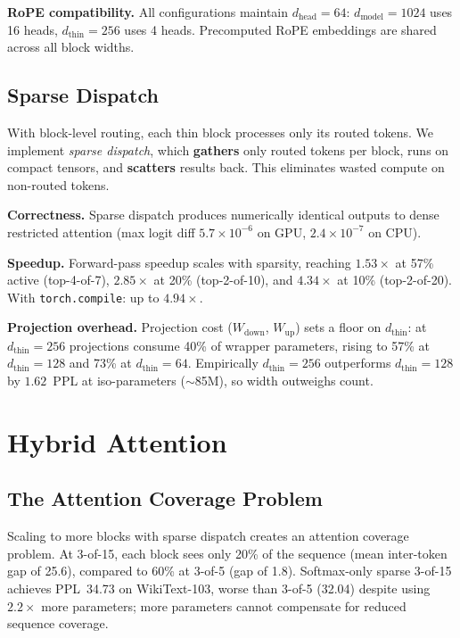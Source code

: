 \documentclass[10pt]{article}
\newcommand{\dmodel}{d_\text{model}}
\newcommand{\dthin}{d_\text{thin}}
\newcommand{\Paragraph}[1]{\vspace{0.5em}\noindent\textbf{#1}}
\begin{document}
\Paragraph{RoPE compatibility.}
All configurations maintain $d_\text{head}{=}64$: $\dmodel{=}1024$ uses 16 heads, $\dthin{=}256$ uses 4 heads.
Precomputed RoPE embeddings are shared across all block widths.

\subsection{Sparse Dispatch}
\label{sec:sparse}

With block-level routing, each thin block processes only its routed tokens.
We implement \emph{sparse dispatch}, which \textbf{gathers} only routed tokens per block, runs on compact tensors, and \textbf{scatters} results back.
This eliminates wasted compute on non-routed tokens.

\Paragraph{Correctness.}
Sparse dispatch produces numerically identical outputs to dense restricted attention (max logit diff $5.7 \times 10^{-6}$ on GPU, $2.4 \times 10^{-7}$ on CPU).

\Paragraph{Speedup.}
Forward-pass speedup scales with sparsity, reaching $1.53\times$ at 57\% active (top-4-of-7), $2.85\times$ at 20\% (top-2-of-10), and $4.34\times$ at 10\% (top-2-of-20).
With \texttt{torch.compile}: up to $4.94\times$.


\Paragraph{Projection overhead.}
Projection cost ($W_\text{down}$, $W_\text{up}$) sets a floor on $\dthin$: at $\dthin{=}256$ projections consume 40\% of wrapper parameters, rising to 57\% at $\dthin{=}128$ and 73\% at $\dthin{=}64$. Empirically $\dthin{=}256$ outperforms $\dthin{=}128$ by $1.62$~PPL at iso-parameters ($\sim$85M), so width outweighs count.

\section{Hybrid Attention}
\label{sec:hybrid}

\subsection{The Attention Coverage Problem}

Scaling to more blocks with sparse dispatch creates an attention coverage problem. At 3-of-15, each block sees only 20\% of the sequence (mean inter-token gap of 25.6), compared to 60\% at 3-of-5 (gap of 1.8).
Softmax-only sparse 3-of-15 achieves PPL~34.73 on WikiText-103, worse than 3-of-5 (32.04) despite using $2.2\times$ more parameters; more parameters cannot compensate for reduced sequence coverage.
\end{document}
